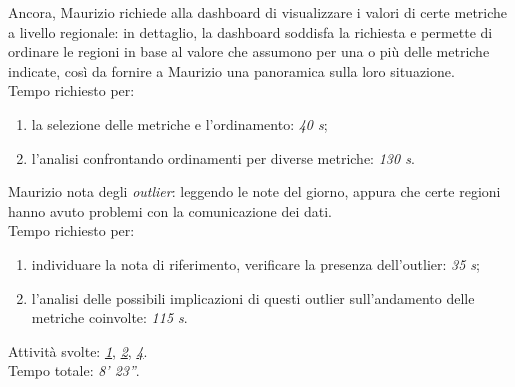 \noindent
Ancora, Maurizio richiede alla dashboard di visualizzare i valori di certe metriche a livello regionale: in dettaglio, la dashboard soddisfa la richiesta e permette di ordinare le regioni in base al valore che assumono per una o più delle metriche indicate, così da fornire a Maurizio una panoramica sulla loro situazione.\\
Tempo richiesto per:
\begin{enumerate}
    \item la selezione delle metriche e l'ordinamento: \textit{40 s};
    \item l'analisi confrontando ordinamenti per diverse metriche: \textit{130 s}.
\end{enumerate}

\noindent
Maurizio nota degli \textit{outlier}:  leggendo le note del giorno, appura che certe regioni hanno avuto problemi con la comunicazione dei dati.\\
Tempo richiesto per:
\begin{enumerate}
    \item individuare la nota di riferimento, verificare la presenza dell'outlier: \textit{35 s};
    \item l'analisi delle possibili implicazioni di questi outlier sull'andamento delle metriche coinvolte: \textit{115 s}.
\end{enumerate}

\noindent
Attività svolte: \hyperref[itm:1]{\textit{1}}, \hyperref[itm:2]{\textit{2}}, \hyperref[itm:4]{\textit{4}}.\\ 
Tempo totale: \textit{8' 23''}. 